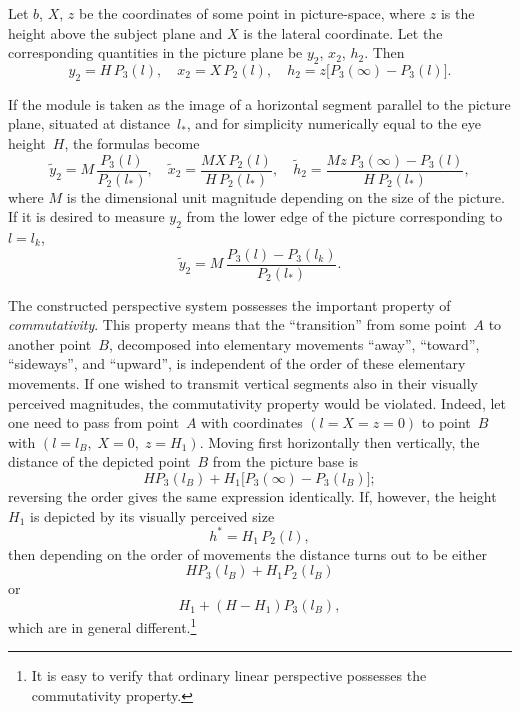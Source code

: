 Let $b$, $X$, $z$ be the coordinates of some point in picture-space, where $z$ is the
height above the subject plane and $X$ is the lateral coordinate.  Let the corresponding
quantities in the picture plane be $y_2$, $x_2$, $h_2$.  Then
\begin{equation}
  y_2 = H\,P_3(l),\quad
  x_2 = X\,P_2(l),\quad
  h_2 = z\bigl[P_3(\infty) - P_3(l)\bigr].  \tag{8.4}
\end{equation}

If the module is taken as the image of a horizontal segment parallel to the picture plane,
situated at distance~$l_*$, and for simplicity numerically equal to the eye height~$H$,
the formulas become
\begin{equation}
  \tilde{y}_2 = M\,\frac{P_3(l)}{P_2(l_*)},\quad
  \tilde{x}_2 = \frac{MX\,P_2(l)}{H\,P_2(l_*)},\quad
  \tilde{h}_2 = \frac{M z \ P_3(\infty) - P_3(l)}{H \ P_2(l_*)},  \tag{8.5}
\end{equation}
where $M$ is the dimensional unit magnitude depending on the size of the picture.  If
it is desired to measure $y_2$ from the lower edge of the picture corresponding to
$l = l_k$,
\begin{equation}
  \tilde{y}_2 = M\,\frac{P_3(l) - P_3(l_k)}{P_2(l_*)}.  \tag{8.6}
\end{equation}

The constructed perspective system possesses the important property of
\emph{commutativity}.  This property means that the ``transition'' from some point~$A$
to another point~$B$, decomposed into elementary movements ``away'', ``toward'',
``sideways'', and ``upward'', is independent of the order of these elementary movements.
If one wished to transmit vertical segments also in their visually perceived magnitudes,
the commutativity property would be violated.  Indeed, let one need to pass from
point~$A$ with coordinates $(l = X = z = 0)$ to point~$B$ with
$(l = l_B,\; X = 0,\; z = H_1)$.  Moving first horizontally then vertically,
the distance of the depicted point~$B$ from the picture base is
\[
  HP_3(l_B) + H_1\bigl[P_3(\infty) - P_3(l_B)\bigr];
\]
reversing the order gives the same expression identically.  If, however, the height~$H_1$
is depicted by its visually perceived size
\[
  h^* = H_1\,P_2(l),
\]
then depending on the order of movements the distance turns out to be either
\[
  HP_3(l_B) + H_1P_2(l_B)
\]
or
\[
  H_1 + (H - H_1)P_3(l_B),
\]
which are in general different.\footnote{It is easy to verify that ordinary linear
  perspective possesses the commutativity property.}

